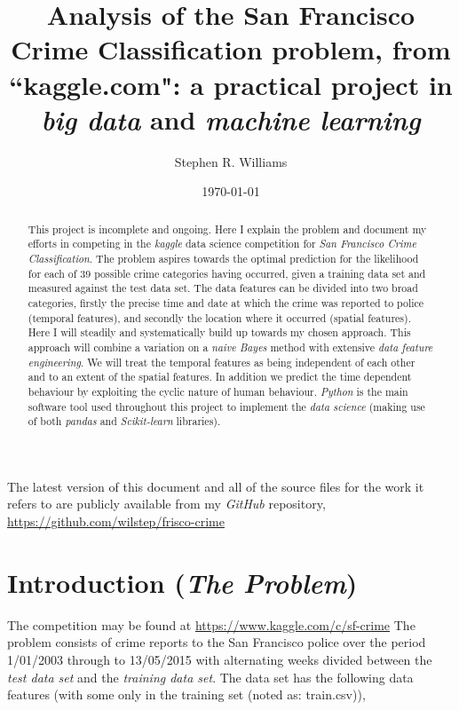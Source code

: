 \documentclass[12pt,notitlepage]{article}
\title{Analysis of the San Francisco Crime Classification problem, from ``kaggle.com": a practical project in \emph{big data} and \emph{machine learning}}
\author{Stephen R. Williams}
\date{\today}  %
\begin{document}
\maketitle

\begin{abstract}
This project is incomplete and ongoing. Here I explain the problem and document my efforts in competing in the \emph{kaggle} data science competition for \emph{San Francisco Crime Classification}. The problem aspires towards the optimal prediction for the likelihood for each of 39 possible crime categories having occurred, given a training data set and measured against the test data set. The data features can be divided into two broad categories, firstly the precise time and date at which the crime was reported to police (temporal features), and secondly the location where it occurred (spatial features). Here I will steadily and systematically build up towards my chosen approach. This approach will combine a variation on a \emph{naive Bayes} method with extensive \emph{data feature engineering}. We will treat the temporal features as being independent of each other and to an extent of the spatial features. In addition we predict the time dependent behaviour by exploiting the cyclic nature of human behaviour. \emph{Python} is the main software tool used throughout this project to implement the \emph{data science} (making use of both \emph{pandas} and \emph{Scikit-learn} libraries).
\end{abstract}

The latest version of this document and all of the source files for the work it refers to are publicly available from my \emph{GitHub} repository, \url{https://github.com/wilstep/frisco-crime}

\section{Introduction (\emph{The Problem})}

The competition may be found at \url{https://www.kaggle.com/c/sf-crime} The problem consists of crime reports to the San Francisco police over the period 1/01/2003 through to 13/05/2015 with alternating weeks divided between the \emph{test data set} and the \emph{training data set}. The data set has the following data features (with some only in the training set (noted as: train.csv)),
 
\end{document}
